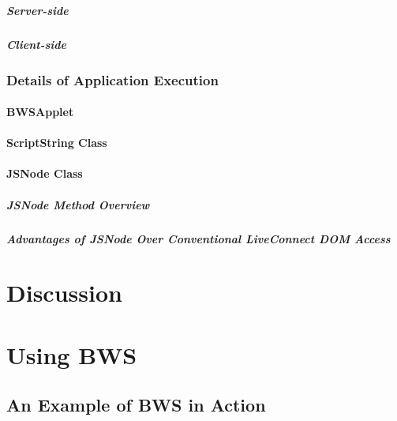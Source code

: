     \paragraph{Server-side}
    \paragraph{Client-side}
   \subsection{Details of Application Execution}
    \subsubsection{BWSApplet}
    \subsubsection{ScriptString Class}
    
     
     
    \subsubsection{JSNode Class}
    
     
     
     \paragraph{JSNode Method Overview}
     
      
      
     \paragraph{Advantages of JSNode Over Conventional LiveConnect DOM Access}
     
      
     
\chapter{Discussion}

\chapter{Using BWS}

 \section{An Example of BWS in Action}
